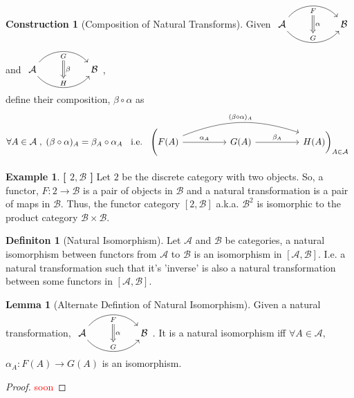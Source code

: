 \documentclass{article}
\theoremstyle{definition}
\newtheorem{example}{Example}[section]
\theoremstyle{definition}
\newtheorem{definition}{Definiton}[section]
\theoremstyle{definition}
\newtheorem{lemma}{Lemma}[section]
\theoremstyle{definition}
\newtheorem{construction}{Construction}[section]
\begin{document}
\begin{construction}[Composition of Natural Transforms]
	Given $\begin{tikzcd}[row sep=large, column sep=huge]
	\mathcal{A} \arrow[r, bend left=50, "F"{name=U, below}]
	\arrow[r, bend right = 50, "G"{name=D, above}]
		& \mathcal{\mathcal{B} }
	\arrow[Rightarrow, from=U , to=D, "\alpha"]
	\end{tikzcd}$ and $\begin{tikzcd}[row sep=large, column sep=huge]
	\mathcal{A} \arrow[r, bend left=50, "G"{name=U, below}]
	\arrow[r, bend right = 50, "H"{name=D, above}]
		& \mathcal{\mathcal{B} }
	\arrow[Rightarrow, from=U , to=D, "\beta"]
	\end{tikzcd}$, \\
	define their composition, $\beta \circ \alpha$ as
	\[ \forall A \in \mathcal{A} \; , \; (\beta \circ \alpha)_A = \beta_A \circ \alpha_A \; \; \text{ i.e. }
		\begin{tikzcd}[row sep=large, column sep=huge]
	\Bigg(F(A) \arrow{r}{\alpha_A} \arrow[bend left=20]{rr}{(\beta \circ \alpha)_A} & G(A) \arrow{r}{\beta_A}
											& H(A)\bigg)_{A \in \mathcal{A} }
\end{tikzcd}
	\]
\end{construction}


\begin{example}{\textbf{[ $2,\mathcal{B}$ ]}} %
	Let $2$ be the discrete category with two objects. So, a functor, $F:2 \rightarrow \mathcal{B} $ is a pair of objects in $\mathcal{B} $ and a natural transformation is a pair of maps in $\mathcal{B} $. Thus, the functor category $[2,\mathcal{B} ]$ a.k.a. $\mathcal{B} ^2$ is isomorphic to the product category $\mathcal{B}  \times \mathcal{B} $.
\end{example}

\begin{definition}[Natural Isomorphism] %
	Let $\mathcal{A} $ and $\mathcal{B} $ be categories, a natural isomorphism between functors from $\mathcal{A} $ to $\mathcal{B} $ is an isomorphism in $[\mathcal{A} ,\mathcal{B} ]$. I.e. a natural transformation such that it's 'inverse' is also a natural transformation between some functors in $[\mathcal{A},\mathcal{B}] $.
\end{definition}
\begin{lemma}[Alternate Defintion of Natural Isomorphism]
	Given a natural transformation, $\begin{tikzcd}[row sep=large, column sep=huge]
	\mathcal{A}  \arrow[r, bend left=50, "F"{name=U, below}]
	\arrow[r, bend right = 50, "G"{name=D, above}]
		& \mathcal{B}
	\arrow[Rightarrow, from=U , to=D, "\alpha"]
	\end{tikzcd}$. It is a natural isomorphism iff $ \forall A \in \mathcal{A} ,$  $\alpha_A : F(A) \rightarrow G(A)$ is an isomorphism.
	\begin{proof}
		\textcolor{red}{soon}
	\end{proof}
\end{lemma}
\end{document}
